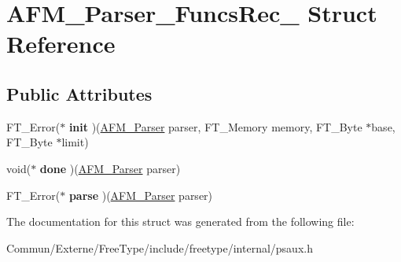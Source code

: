 \hypertarget{struct_a_f_m___parser___funcs_rec__}{}\section{A\+F\+M\+\_\+\+Parser\+\_\+\+Funcs\+Rec\+\_\+ Struct Reference}
\label{struct_a_f_m___parser___funcs_rec__}
\subsection*{Public Attributes}
\begin{DoxyCompactItemize}
\item 
F\+T\+\_\+\+Error($\ast$ {\bfseries init} )(\hyperlink{struct_a_f_m___parser_rec__}{A\+F\+M\+\_\+\+Parser} parser, F\+T\+\_\+\+Memory memory, F\+T\+\_\+\+Byte $\ast$base, F\+T\+\_\+\+Byte $\ast$limit)\hypertarget{struct_a_f_m___parser___funcs_rec___ab96ca52171618217bc852d01dbdaf4ad}{}\label{struct_a_f_m___parser___funcs_rec___ab96ca52171618217bc852d01dbdaf4ad}

\item 
void($\ast$ {\bfseries done} )(\hyperlink{struct_a_f_m___parser_rec__}{A\+F\+M\+\_\+\+Parser} parser)\hypertarget{struct_a_f_m___parser___funcs_rec___ae084d9f1b6768f93629073c9d1c98aee}{}\label{struct_a_f_m___parser___funcs_rec___ae084d9f1b6768f93629073c9d1c98aee}

\item 
F\+T\+\_\+\+Error($\ast$ {\bfseries parse} )(\hyperlink{struct_a_f_m___parser_rec__}{A\+F\+M\+\_\+\+Parser} parser)\hypertarget{struct_a_f_m___parser___funcs_rec___ad8f41aafada1b5a84f5e1ac46f545669}{}\label{struct_a_f_m___parser___funcs_rec___ad8f41aafada1b5a84f5e1ac46f545669}

\end{DoxyCompactItemize}


The documentation for this struct was generated from the following file\+:\begin{DoxyCompactItemize}
\item 
Commun/\+Externe/\+Free\+Type/include/freetype/internal/psaux.\+h\end{DoxyCompactItemize}
